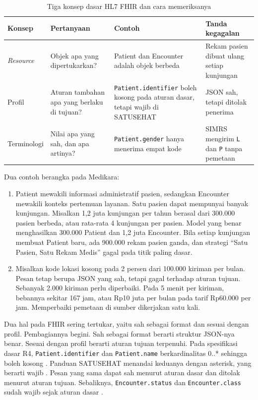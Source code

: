 \begin{table}[!htb]
  \centering
  \caption{Tiga konsep dasar HL7 FHIR dan cara memeriksanya}
  \label{tab:ch07-fhir-unsur}
  \footnotesize
  \begin{tabularx}{\textwidth}{B{1.8cm}AAA}
    \hline
    \textbf{Konsep} & \textbf{Pertanyaan} & \textbf{Contoh} & \textbf{Tanda kegagalan} \\ \hline
    \textit{Resource} & Objek apa yang dipertukarkan? & Patient dan Encounter adalah objek berbeda & Rekam pasien dibuat ulang setiap kunjungan \\ \hline
    Profil & Aturan tambahan apa yang berlaku di tujuan? & \texttt{Patient.identifier} boleh kosong pada aturan dasar, tetapi wajib di SATUSEHAT & JSON sah, tetapi ditolak penerima \\ \hline
    Terminologi & Nilai apa yang sah, dan apa artinya? & \texttt{Patient.gender} hanya menerima empat kode & SIMRS mengirim \texttt{L} dan \texttt{P} tanpa pemetaan \\ \hline
  \end{tabularx}
\end{table}

Dua contoh berangka pada Medikara:
\begin{enumerate}
  \item Patient mewakili informasi administratif pasien, sedangkan Encounter mewakili konteks pertemuan layanan. Satu
        pasien dapat mempunyai banyak kunjungan. Misalkan 1,2 juta kunjungan per tahun berasal dari 300.000 pasien
        berbeda, atau rata-rata 4 kunjungan per pasien. Model yang benar menghasilkan 300.000 Patient dan 1,2 juta
        Encounter. Bila setiap kunjungan membuat Patient baru, ada 900.000 rekam pasien ganda, dan strategi ``Satu
        Pasien, Satu Rekam Medis'' gagal pada titik paling dasar.
  \item Misalkan kode lokasi kosong pada 2 persen dari 100.000 kiriman per bulan. Pesan tetap berupa JSON yang sah,
        tetapi gagal terhadap aturan tujuan. Sebanyak 2.000 kiriman perlu diperbaiki. Pada 5 menit per kiriman,
        bebannya sekitar 167 jam, atau Rp10 juta per bulan pada tarif Rp60.000 per jam. Memperbaiki pemetaan di sumber
        dikerjakan satu kali.
\end{enumerate}

Dua hal pada FHIR sering tertukar, yaitu sah sebagai format dan sesuai dengan profil. Pembagiannya begini. Sah sebagai
format berarti struktur JSON-nya benar. Sesuai dengan profil berarti aturan tujuan terpenuhi. Pada spesifikasi dasar
R4, \texttt{Patient.identifier} dan \texttt{Patient.name} berkardinalitas 0..* sehingga boleh kosong
\cite{c07-fhir-patient}. Panduan SATUSEHAT menandai keduanya dengan asterisk, yang berarti wajib
\cite{c07-satusehat-patient}. Pesan yang sama dapat sah menurut aturan dasar dan ditolak menurut aturan tujuan.
Sebaliknya, \texttt{Encounter.status} dan \texttt{Encounter.class} sudah wajib sejak aturan dasar
\cite{c07-fhir-encounter}.

